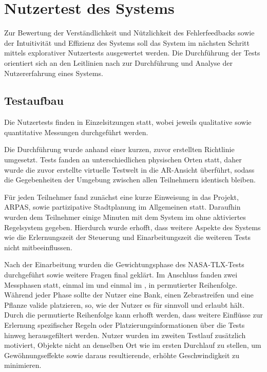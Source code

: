\section{Nutzertest des Systems}\label{section:Usertesting des Systems}

Zur Bewertung der Verständlichkeit und Nützlichkeit des Fehlerfeedbacks sowie der Intuitivität und Effizienz des Systems soll das System im nächsten Schritt mittels explorativer Nutzertests ausgewertet werden. Die Durchführung der Tests orientiert sich an den Leitlinien nach \textcite{albertMeasuringUserExperience2022} zur Durchführung und Analyse der Nutzererfahrung eines Systems.

\subsection{Testaufbau}

Die Nutzertests finden in Einzelsitzungen statt, wobei jeweils qualitative sowie quantitative Messungen durchgeführt werden.

Die Durchführung wurde anhand einer kurzen, zuvor erstellten Richtlinie umgesetzt. Tests fanden an unterschiedlichen physischen Orten statt, daher wurde die zuvor erstellte virtuelle Testwelt in die AR-Ansicht überführt, sodass die Gegebenheiten der Umgebung zwischen allen Teilnehmern identisch bleiben.

Für jeden Teilnehmer fand zunächst eine kurze Einweisung in das Projekt, ARPAS, sowie partizipative Stadtplanung im Allgemeinen statt. Daraufhin wurden dem Teilnehmer einige Minuten mit dem System im  ohne aktiviertes Regelsystem gegeben. Hierdurch wurde erhofft, dass weitere Aspekte des Systems wie die Erlernungszeit der Steuerung und Einarbeitungszeit die weiteren Tests nicht mitbeeinflussen.

Nach der Einarbeitung wurden die Gewichtungsphase des NASA-TLX-Tests durchgeführt sowie weitere Fragen final geklärt. Im Anschluss fanden zwei Messphasen statt, einmal im  und einmal im , in permutierter Reihenfolge.
Während jeder Phase sollte der Nutzer eine Bank, einen Zebrastreifen und eine Pflanze valide platzieren, so, wie der Nutzer es für sinnvoll und erlaubt hält. Durch die permutierte Reihenfolge kann erhofft werden, dass weitere Einflüsse zur Erlernung spezifischer Regeln oder Platzierungsinformationen über die Tests hinweg herausgefiltert werden. Nutzer wurden im zweiten Testlauf zusätzlich motiviert, Objekte nicht an denselben Ort wie im ersten Durchlauf zu stellen, um Gewöhnungseffekte sowie daraus resultierende, erhöhte Geschwindigkeit zu minimieren.

